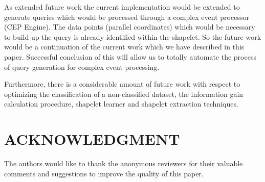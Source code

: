 \documentclass[conference]{IEEEtran}  %
\begin{document}
As extended future work the current implementation would be extended to generate queries which would be processed through a complex event processor (CEP Engine). The data points (parallel coordinates) which would be necessary to build up the query is already identified within the shapelet. So the future work would be a continuation of the current work which we have described in this paper. Successful conclusion of this will allow us to totally automate the process of query generation for complex event processing. 

Furthermore, there is a considerable amount of future work with respect to optimizing the classification of a non-classified dataset, the information gain calculation procedure, shapelet learner and shapelet extraction techniques. 

\section{ACKNOWLEDGMENT}
The authors would like to thank the anonymous reviewers for their valuable comments and suggestions to improve the quality of this paper.
\end{document}
